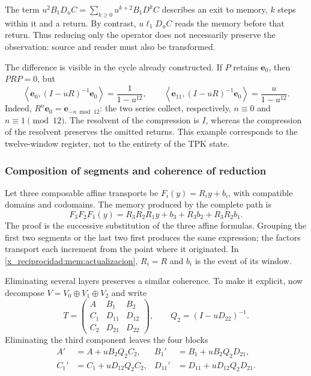 The term \(u^2B_1D_uC=\sum_{k\geq0}u^{k+2}B_1D^kC\)
describes an exit to memory, \(k\) steps within it and
a return. By contrast, \(u\ell_1D_uC\) reads the memory before that
return. Thus reducing only the operator does not necessarily preserve
the observation: source and reader must also be transformed.

The difference is visible in the cycle already constructed. If \(P\) retains
\(\mathbf e_0\), then \(PRP=0\), but
\begin{equation}
 \left\langle\mathbf e_0,(I-uR)^{-1}\mathbf e_0\right\rangle
 =\frac1{1-u^{12}},\qquad
 \left\langle\mathbf e_{11},(I-uR)^{-1}\mathbf e_0\right\rangle
 =\frac u{1-u^{12}}.
 \label{x_reciprocidad:mem:ejemplo-ciclo}
\end{equation}
Indeed, \(R^n\mathbf e_0=\mathbf e_{-n\bmod12}\): the
two series collect, respectively, \(n\equiv0\) and
\(n\equiv1\pmod{12}\). The resolvent of the compression is \(I\),
whereas the compression of the resolvent preserves the omitted returns.
This example corresponds to the twelve-window register, not to the entirety
of the TPK state.

\subsubsection{Composition of segments and coherence of reduction}

Let three composable affine transports be
\(F_i(y)=R_i y+b_i\), with compatible domains and codomains.
The memory produced by the complete path is
\begin{equation}
 F_3F_2F_1(y)
 =R_3R_2R_1y+b_3+R_3b_2+R_3R_2b_1.
 \label{x_reciprocidad:mem:cociclo-tres}
\end{equation}
The proof is the successive substitution of the three affine formulas.
Grouping the first two segments or the last two first produces
the same expression; the factors transport each increment from
the point where it originated. In \eqref{x_reciprocidad:mem:actualizacion},
\(R_i=R\) and \(b_i\) is the event of its window.

Eliminating several layers preserves a similar coherence.
To make it explicit, now decompose
\(V=V_0\oplus V_1\oplus V_2\) and write
\[
 T=\begin{pmatrix}
 A&B_1&B_2\\C_1&D_{11}&D_{12}\\C_2&D_{21}&D_{22}
 \end{pmatrix},\qquad Q_2=(I-uD_{22})^{-1}.
\]
Eliminating the third component leaves the four blocks
\begin{equation}
 \begin{aligned}
 A'&=A+uB_2Q_2C_2,&
 B_1'&=B_1+uB_2Q_2D_{21},\\
 C_1'&=C_1+uD_{12}Q_2C_2,&
 D_{11}'&=D_{11}+uD_{12}Q_2D_{21}.
 \end{aligned}
 \label{x_reciprocidad:mem:schur-intermedio}
\end{equation}

